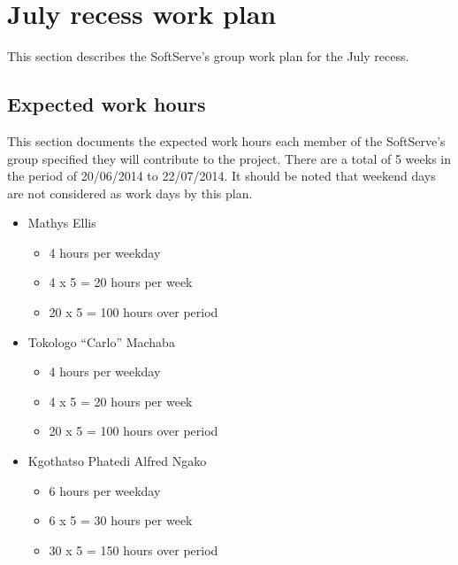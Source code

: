 \documentclass[12pt]{article}
\begin{document}
\section{July recess work plan}
This section describes the SoftServe's group work plan for the July recess.

\subsection{Expected work hours}
This section documents the expected work hours each member of the SoftServe's group specified they will contribute to the project. There are a total of 5 weeks in the period of 20/06/2014 to 22/07/2014. It should be noted that weekend days are not considered as work days by this plan.
\begin{itemize}
	\item Mathys Ellis
	\begin{itemize}
		\item 4 hours per weekday
		\item 4 x 5 = 20 hours per week
		\item 20 x 5 = 100 hours over period
	\end{itemize}
	\item Tokologo “Carlo” Machaba
	\begin{itemize}
		\item 4 hours per weekday
		\item 4 x 5 = 20 hours per week
		\item 20 x 5 = 100 hours over period
	\end{itemize}
	\item Kgothatso Phatedi Alfred Ngako
	\begin{itemize}
		\item 6 hours per weekday
		\item 6 x 5 = 30 hours per week
		\item 30 x 5 = 150 hours over period
	\end{itemize}
\end{itemize}
\end{document}

